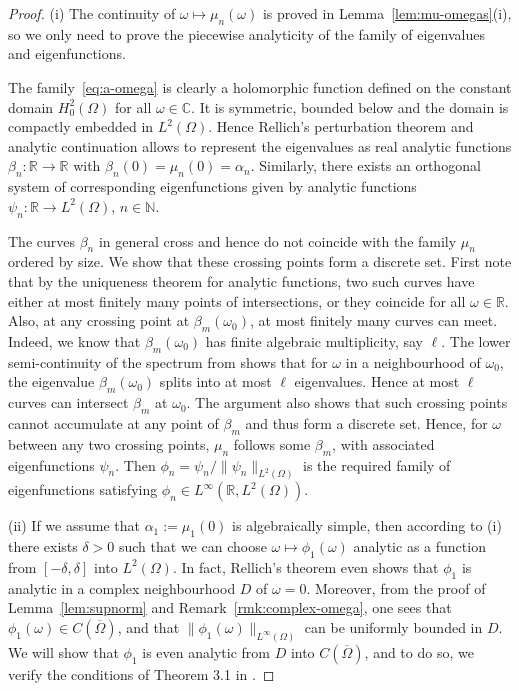 \documentclass[a4paper, reqno]{amsart}
\numberwithin{equation}{section}
\theoremstyle{plain}
\theoremstyle{definition}
\theoremstyle{remark}
\newcommand{\NN}{\mathbb{N}}
\newcommand{\RR}{\mathbb{R}}
\newcommand{\CC}{\mathbb{C}}
\begin{document}
\begin{proof}
  (i) The continuity of $\omega\mapsto\mu_n(\omega)$ is proved in Lemma~\ref{lem:mu-omegas}(i), so we only need to prove the piecewise analyticity of the family of eigenvalues and eigenfunctions.

  The family~\eqref{eq:a-omega} is clearly a holomorphic function defined on the constant domain $H_0^2(\Omega)$ for all $\omega\in\CC$. It is symmetric, bounded below and the domain is compactly embedded in $L^2(\Omega)$. Hence Rellich's perturbation theorem \cite[Theorem~II.10.1]{R69} and analytic continuation allows to represent the eigenvalues as real analytic functions $\beta_n\colon\RR\to\RR$ with $\beta_n(0)=\mu_n(0)=\alpha_n$. Similarly, there exists an orthogonal system of corresponding eigenfunctions given by analytic functions $\psi_n\colon\RR\to L^2(\Omega)$, $n\in\NN$.

  The curves $\beta_n$ in general cross and hence do not coincide with the family $\mu_n$ ordered by size. We show that these crossing points form a discrete set. First note that by the uniqueness theorem for analytic functions, two such curves have either at most finitely many points of intersections, or they coincide for all $\omega\in\RR$. Also, at any crossing point at $\beta_m(\omega_0)$, at most finitely many curves can meet. Indeed, we know that $\beta_m(\omega_0)$ has finite algebraic multiplicity, say $\ell$. The lower semi-continuity of the spectrum from \cite[Theorem IV.3.16]{KAT} shows that for $\omega$ in a neighbourhood of $\omega_0$, the eigenvalue $\beta_m(\omega_0)$ splits into at most $\ell$ eigenvalues. Hence at most $\ell$ curves can intersect $\beta_m$ at $\omega_0$. The argument also shows that such crossing points cannot accumulate at any point of $\beta_m$ and thus form a discrete set. Hence, for $\omega$ between any two crossing points, $\mu_n$ follows some $\beta_m$, with associated eigenfunctions $\psi_n$. Then $\phi_n = \psi_n / \|\psi_n\|_{L^2(\Omega)}$ is the required family of eigenfunctions satisfying $\phi_n \in L^\infty(\RR, L^2(\Omega))$.

  (ii) If we assume that $\alpha_1 := \mu_1(0)$ is algebraically simple, then according to (i) there exists $\delta>0$ such that we can choose $\omega\mapsto\phi_1(\omega)$ analytic as a function from $[-\delta,\delta]$ into $L^2(\Omega)$. In fact, Rellich's theorem even shows that $\phi_1$ is analytic in a complex neighbourhood $D$ of $\omega = 0$. Moreover, from the proof of Lemma~\ref{lem:supnorm} and Remark~\ref{rmk:complex-omega}, one sees that $\phi_1(\omega)\in C(\overline\Omega)$, and that $\|\phi_1(\omega)\|_{L^\infty(\Omega)}$ can be uniformly bounded in $D$. We will show that $\phi_1$ is even analytic from $D$ into $C(\overline\Omega)$, and to do so, we verify the conditions of Theorem 3.1 in \cite{AN00}.


\end{proof}
\end{document}
